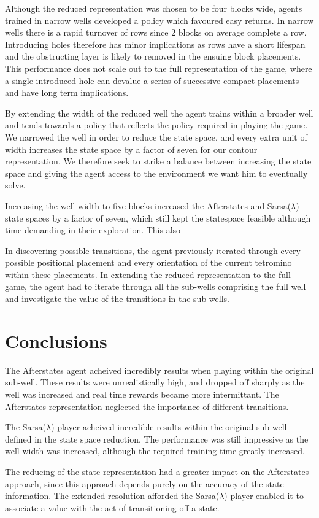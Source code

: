 \documentclass{rucsthesis}
\begin{document}
Although the reduced representation was chosen to be four blocks wide, agents trained in narrow wells developed a policy which favoured easy returns. In narrow wells there is a rapid turnover of rows since 2 blocks on average complete a row. Introducing holes therefore has minor implications as rows have a short lifespan and the obstructing layer is likely to removed in the ensuing block placements. This performance does not scale out to the full representation of the game, where a single introduced hole can devalue a series of successive compact placements and have long term implications.

By extending the width of the reduced well the agent trains within a broader well and tends towards a policy that reflects the policy required in playing the game. We narrowed the well in order to reduce the state space, and every extra unit of width increases the state space by a factor of seven for our contour representation. We therefore seek to strike a balance between increasing the state space and giving the agent access to the environment we want him to eventually solve.

Increasing the well width to five blocks increased the Afterstates and Sarsa($\lambda$) state spaces by a factor of seven, which still kept the statespace feasible although time demanding in their exploration. This also 
 
In discovering possible transitions, the agent previously iterated through every possible positional placement and every orientation of the current tetromino within these placements. In extending the reduced representation to the full game, the agent had to iterate through all the sub-wells comprising the full well and investigate the value of the transitions in the sub-wells.


\chapter{Conclusions}

The Afterstates agent acheived incredibly results when playing within the original sub-well. These results were unrealistically high, and dropped off sharply as the well was increased and real time rewards became more intermittant. The Afterstates representation neglected the importance of different transitions.

The Sarsa($\lambda$) player acheived incredible results within the original sub-well defined in the state space reduction. The performance was still impressive as the well width was increased, although the required training time greatly increased.

The reducing of the state representation had a greater impact on the Afterstates approach, since this approach depends purely on the accuracy of the state information. The extended resolution afforded the Sarsa($\lambda$) player enabled it to associate a value with the act of transitioning off a state. 


\end{document}
